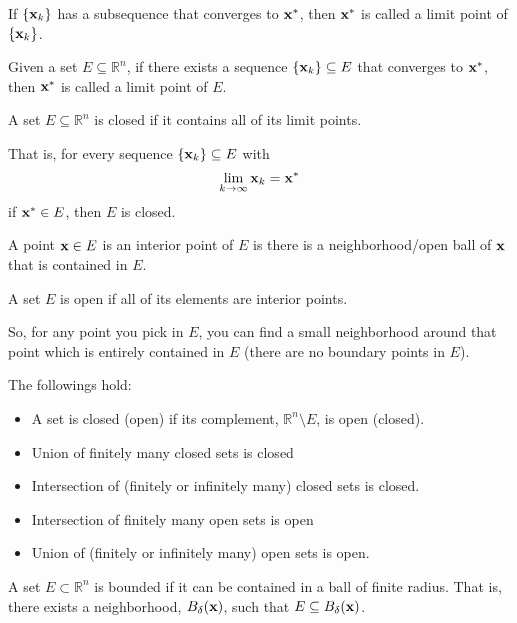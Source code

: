 \begin{definition}
  If $\{\textbf{x}_k\}$ has a subsequence that converges to $\textbf{x}^*$, then $\textbf{x}^*$ is called a limit point of $\{\textbf{x}_k\}$.

  Given a set $E \subseteq \mathbb R^n$, if there exists a sequence $\{\textbf{x}_k\} \subseteq E$ that converges to $\textbf{x}^*$, then $\textbf{x}^*$ is called a limit point of $E$.
\end{definition}
\begin{definition}
  A set $E \subseteq \mathbb R^n$ is closed if it contains all of its limit points.

  That is, for every sequence $\{\textbf{x}_k\} \subseteq E$ with $$\lim_{k \rightarrow \infty} \textbf{x}_k = \textbf{x}^*$$ if $\textbf{x}^* \in E$, then $E$ is closed.
\end{definition}
\begin{definition}
  A point $\textbf{x} \in E$ is an interior point of $E$ is there is a neighborhood/open ball of $\textbf{x}$ that is contained in $E$.
\end{definition}
\begin{definition}
  A set $E$ is open if all of its elements are interior points.

  So, for any point you pick in $E$, you can find a small neighborhood around that point which is entirely contained in $E$ (there are no boundary points in $E$).
\end{definition}
\begin{theorem}
  The followings hold:
  \begin{itemize}
    \item A set is closed (open) if its complement, $\mathbb R^n \setminus E$, is open (closed).
    \item Union of finitely many closed sets is closed
    \item Intersection of (finitely or infinitely many) closed sets is closed.
    \item Intersection of finitely many open sets is open
    \item Union of (finitely or infinitely many) open sets is open.
  \end{itemize}
\end{theorem}
\begin{definition}[Bounded]
  A set $E \subset \mathbb R^n$ is bounded if it can be contained in a ball of finite radius. That is, there exists a neighborhood, $B_\delta(\textbf{x})$, such that $E \subseteq B_\delta(\textbf{x})$.
\end{definition}
